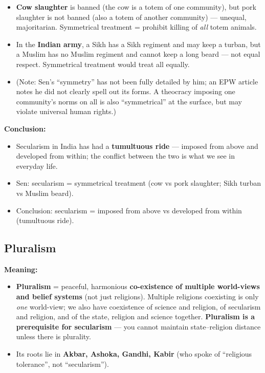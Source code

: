 \begin{ExampleBox}
\begin{itemize}
\item \textbf{Cow slaughter} is banned (the cow is a totem of one community), but pork slaughter is not banned (also a totem of another community) --- unequal, majoritarian. Symmetrical treatment = prohibit killing of \textit{all} totem animals.
\item In the \textbf{Indian army}, a Sikh has a Sikh regiment and may keep a turban, but a Muslim has no Muslim regiment and cannot keep a long beard --- not equal respect. Symmetrical treatment would treat all equally.
\item (Note: Sen's ``symmetry'' has not been fully detailed by him; an EPW article notes he did not clearly spell out its forms. A theocracy imposing one community's norms on all is also ``symmetrical'' at the surface, but may violate universal human rights.)
\end{itemize}
\end{ExampleBox}

\begin{DataFact}
\textbf{Conclusion:}
\begin{itemize}
\item Secularism in India has had a \textbf{tumultuous ride} --- imposed from above and developed from within; the conflict between the two is what we see in everyday life.
\end{itemize}
\end{DataFact}

\begin{QuickRevision}
\begin{itemize}
\item Sen: secularism = symmetrical treatment (cow vs pork slaughter; Sikh turban vs Muslim beard).
\item Conclusion: secularism = imposed from above vs developed from within (tumultuous ride).
\end{itemize}
\end{QuickRevision}

\sectiondivider

\subsection{Pluralism}

\begin{KeyConcept}
\textbf{Meaning:}
\begin{itemize}
\item \textbf{Pluralism} = peaceful, harmonious \textbf{co-existence of multiple world-views and belief systems} (not just religions). Multiple religions coexisting is only \textit{one} world-view; we also have coexistence of science and religion, of secularism and religion, and of the state, religion and science together. \textbf{Pluralism is a prerequisite for secularism} --- you cannot maintain state--religion distance unless there is plurality.
\item Its roots lie in \textbf{Akbar, Ashoka, Gandhi, Kabir} (who spoke of ``religious tolerance'', not ``secularism'').
\end{itemize}
\end{KeyConcept}

